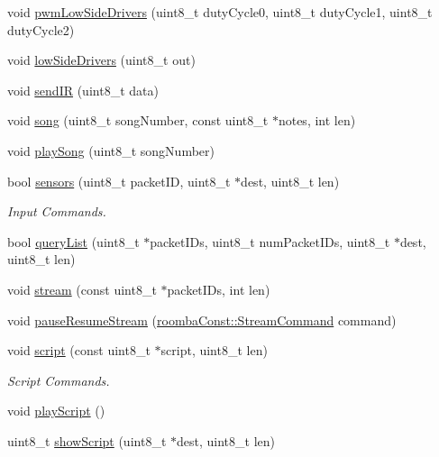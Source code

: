 \begin{DoxyCompactItemize}
\item 
void \hyperlink{class_arduino_roomba_a5be9ba9927edecc77905c92771d7a483}{pwmLowSideDrivers} (uint8\_\-t dutyCycle0, uint8\_\-t dutyCycle1, uint8\_\-t dutyCycle2)
\item 
void \hyperlink{class_arduino_roomba_ae9f66b6d0eb850b4bcae3aeaa9b092e2}{lowSideDrivers} (uint8\_\-t out)
\item 
void \hyperlink{class_arduino_roomba_a268d068b9c0253f237165de1bbbc11df}{sendIR} (uint8\_\-t data)
\item 
void \hyperlink{class_arduino_roomba_aef389c1f20272d988463227a3014dd03}{song} (uint8\_\-t songNumber, const uint8\_\-t $\ast$notes, int len)
\item 
void \hyperlink{class_arduino_roomba_a8c89574185bae1b51e96aa79ce2790ed}{playSong} (uint8\_\-t songNumber)
\item 
bool \hyperlink{class_arduino_roomba_a4f4e7139b7cd0ec2ddbb09d18e8a8f08}{sensors} (uint8\_\-t packetID, uint8\_\-t $\ast$dest, uint8\_\-t len)
\begin{DoxyCompactList}\small\item\em Input Commands. \item\end{DoxyCompactList}\item 
bool \hyperlink{class_arduino_roomba_a44be486f377bec58f83bfebc4791f298}{queryList} (uint8\_\-t $\ast$packetIDs, uint8\_\-t numPacketIDs, uint8\_\-t $\ast$dest, uint8\_\-t len)
\item 
void \hyperlink{class_arduino_roomba_a687c72eb69928dba45aa53aa39af2f1f}{stream} (const uint8\_\-t $\ast$packetIDs, int len)
\item 
void \hyperlink{class_arduino_roomba_a9563d94e22335c334cdc0791b4c5b1cf}{pauseResumeStream} (\hyperlink{namespaceroomba_const_a4461c36ce27a19fdecb5edd81727a1ce}{roombaConst::StreamCommand} command)
\item 
void \hyperlink{class_arduino_roomba_a4d8122739d5e828f963f6e51ee4d101a}{script} (const uint8\_\-t $\ast$script, uint8\_\-t len)
\begin{DoxyCompactList}\small\item\em Script Commands. \item\end{DoxyCompactList}\item 
void \hyperlink{class_arduino_roomba_a8f5bd40d2d4c26a314f2ee649d7605ae}{playScript} ()
\item 
uint8\_\-t \hyperlink{class_arduino_roomba_a12e3789abd74c01eac4e1f094edc0f8d}{showScript} (uint8\_\-t $\ast$dest, uint8\_\-t len)

\end{DoxyCompactItemize}
